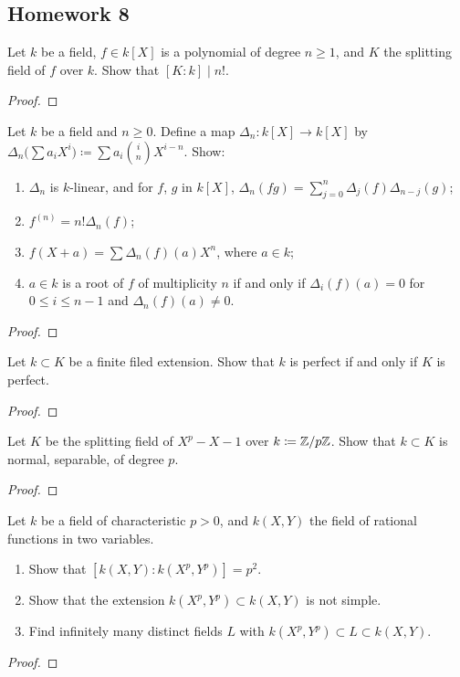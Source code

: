 \subsection{Homework 8}
\begin{problem}
  Let $k$ be a field, $f\in k[X]$ is a polynomial of degree $n\geq 1$,
  and $K$ the splitting field of $f$ over $k$. Show that
  $[K:k]\mid n!$.
\end{problem}
\begin{proof}
\end{proof}

\begin{problem}
  Let $k$ be a field and $n\geq 0$. Define a map
  $\Delta_n\colon k[X]\to k[X]$ by
  $\Delta_n\bigl(\sum a_iX^i\bigr)\coloneq\sum
  a_i\binom{i}{n}X^{i-n}$. Show:
\begin{enumerate}[label=(\alph*),noitemsep]
\item $\Delta_n$ is $k$-linear, and for $f$, $g$ in $k[X]$,
  $\Delta_n(fg)=\sum_{j=0}^n\Delta_j(f)\Delta_{n-j}(g)$;
\item $f^{(n)}=n!\Delta_n(f)$;
\item $f(X+a)=\sum\Delta_n(f)(a)X^n$, where $a\in k$;
\item $a\in k$ is a root of $f$ of multiplicity $n$ if and only if
  $\Delta_i(f)(a)=0$ for $0\leq i\leq n-1$ and $\Delta_n(f)(a)\neq 0$.
\end{enumerate}
\end{problem}
\begin{proof}
\end{proof}

\begin{problem}
  Let $k\subset K$ be a finite filed extension. Show that $k$ is
  perfect if and only if $K$ is perfect.
\end{problem}
\begin{proof}
\end{proof}

\begin{problem}
  Let $K$ be the splitting field of $X^p-X-1$ over
  $k\coloneq\mathbb{Z}/p\mathbb{Z}$. Show that $k\subset K$ is normal,
  separable, of degree $p$.
\end{problem}
\begin{proof}
\end{proof}

\begin{problem}
  Let $k$ be a field of characteristic $p>0$, and $k(X,Y)$ the field
  of rational functions in two variables.
\begin{enumerate}[label=(\alph*),noitemsep]
\item Show that $\left[k(X,Y):k(X^p,Y^p)\right]=p^2$.
\item Show that the extension $k(X^p,Y^p)\subset k(X,Y)$ is not
  simple.
\item Find infinitely many distinct fields $L$ with
  $k(X^p,Y^p)\subset L\subset k(X,Y)$.
\end{enumerate}
\end{problem}
\begin{proof}
\end{proof}

